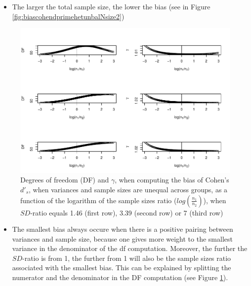 \documentclass[
  man]{apa6}
\providecommand{\tightlist}{%
  \setlength{\itemsep}{0pt}\setlength{\parskip}{0pt}}
\begin{document}
\begin{itemize}
\tightlist
\item
  The larger the total sample size, the lower the bias (see in Figure \ref{fig:biascohendprimehetunbalNsize2})
\end{itemize}

\begin{figure}
\centering
\includegraphics{Theoretical-Bias-of-all-estimators-as-a-function-of-population-parameters_files/figure-latex/biascohendprimehetunbaldfandbias-1.pdf}
\caption{\label{fig:biascohendprimehetunbaldfandbias}Degrees of freedom (DF) and \(\gamma\), when computing the bias of Cohen's \(d'_s\), when variances and sample sizes are unequal across groups, as a function of the logarithm of the sample sizes ratio (\(log \left( \frac{n_1}{n_2} \right)\)), when \(SD\)-ratio equals 1.46 (first row), 3.39 (second row) or 7 (third row)}
\end{figure}

\begin{itemize}
\tightlist
\item
  The smallest bias always occure when there is a positive pairing between variances and sample size, because one gives more weight to the smallest variance in the denominator of the df computation. Moreover, the further the \(SD\)-ratio is from 1, the further from 1 will also be the sample sizes ratio associated with the smallest bias. This can be explained by splitting the numerator and the denominator in the DF computation (see Figure \ref{fig:biascohendprimehetunbaldfandbias}).
\end{itemize}
\end{document}
